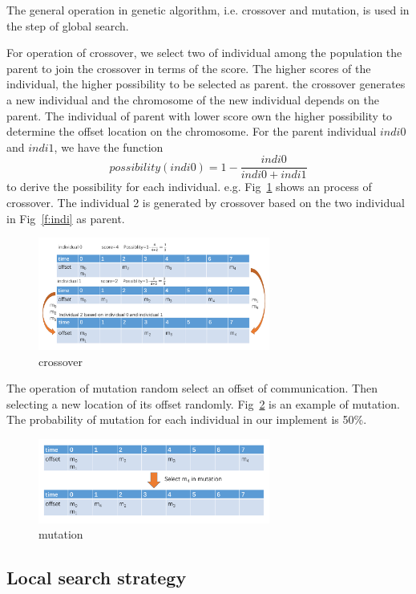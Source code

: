 \documentclass[jornal]{IEEEtran}
\begin{document}
The general operation in genetic algorithm, i.e. crossover and mutation, is used in the step of global search. 

For operation of crossover, we select two of individual among the population the parent to join the crossover in terms of the score. The higher scores of the individual, the higher possibility to be selected as parent. the crossover generates a new individual and the chromosome of the new individual depends on the parent. The individual of parent with lower score own the higher possibility to determine the offset location on the chromosome. For the parent individual $indi0$ and $indi1$, we have the function
\begin{equation}
	possibility(indi0)=1-\frac{indi0}{indi0+indi1}
\end{equation}
to derive the possibility for each individual. e.g. Fig~\ref{f:crossover} shows an process of crossover. The individual 2 is generated by crossover based on the two individual in Fig~\ref{f:indi} as parent.
\begin{figure}[!t]
	\centering
	\includegraphics[width=3in]{picture/crossover.pdf}
	\caption{crossover}
	\label{f:crossover}
\end{figure}

The operation of mutation random select an offset of communication. Then selecting a new location of its offset randomly. Fig~\ref{f:mutation} is an example of mutation. The probability of mutation for each individual in our implement is 50\%.
\begin{figure}[!t]
	\centering
	\includegraphics[width=3in]{picture/mutation.pdf}
	\caption{mutation}
	\label{f:mutation}
\end{figure}

\subsection{Local search strategy}
\end{document}
